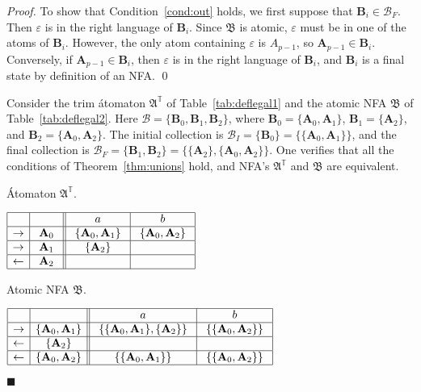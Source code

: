 \documentclass{llncs}
\newcommand{\eps}{\varepsilon}
\newcommand{\bA}{{\mathbf A}}
\newcommand{\bmB}{\bm{B}}
\newcommand{\cB}{{\mathcal B}}
\newcommand{\fA}{{\mathfrak A}}
\newcommand{\fB}{{\mathfrak B}}
\newcommand{\trim}{\mathbb{T}}
\newcommand{\qedb}{\hfill$\blacksquare$}
\begin{document}
\begin{proof}
To show that Condition~\ref{cond:out} holds, we first suppose that
$\bmB_i\in \cB_F$. Then $\eps$ is in the right language of $\bmB_i$.
Since $\fB$ is atomic, $\eps$ must be in one of the atoms of $\bmB_i$.
However, the only atom containing $\eps$ is $A_{p-1}$, so $\bA_{p-1}\in\bmB_i$.
Conversely, if $\bA_{p-1}\in \bmB_i$, then $\eps$ is in the right language of  
$\bmB_i$, and $\bmB_i$ is a final state by definition of an NFA.
\qed
\end{proof}

\begin{example}
\label{ex:atomconstr}
Consider the trim \'atomaton $\fA^\trim$ of Table~\ref{tab:deflegal1} and 
the atomic NFA $\fB$ of Table~\ref{tab:deflegal2}.
Here $\cB=\{\bmB_0,\bmB_1,\bmB_2 \}$, where $\bmB_0=\{\bA_0,\bA_1\}$,
$\bmB_1=\{\bA_2\}$, and 
$\bmB_2=\{\bA_0,\bA_2\}$.
The initial collection is $\cB_I=\{\bmB_0 \}=\{ \{\bA_0,\bA_1\} \}$, and the final
collection is 
$\cB_F=\{\bmB_1,\bmB_2 \}=\{ \{\bA_2\},\{\bA_0,\bA_2\} \}$.
One verifies that all the conditions of Theorem~\ref{thm:unions} hold,
and  NFA's $\fA^\trim$ and $\fB$ are equivalent.
\begin{table}[t]
\begin{minipage}[b]{0.37\linewidth}
\caption{\'Atomaton $\fA^\trim$.}
\label{tab:deflegal1}
$
\begin{array}{|c| c||c| c| c|c|}    
\hline
& \ \  \ \ 
&\ \ a \ \ &\ \ b \ \   \\
\hline  
\rightarrow & \ \bA_0 \
&  \ \{\bA_0,\bA_1\} \  & \ \{\bA_0,\bA_2\} \    \\
\hline  
\rightarrow& \bA_1
&  \  \{\bA_2\} \  &   \\
\hline  
\leftarrow& \bA_2
&  \   \  &   \\
\hline
\end{array}
$
\end{minipage}
\hspace{.5cm}
\begin{minipage}[b]{0.55\linewidth}
\caption{Atomic NFA $\fB$.}
\label{tab:deflegal2}
$
\begin{array}{|c| c||c| c| }    
\hline
& \ \  \ \ 
&\ \ a \ \ &\ \ b \ \ \\
\hline  
\rightarrow & \{\bA_0,\bA_1\}
& \ \{ \{\bA_0,\bA_1\},\{\bA_2\} \} \ & \ \{ \{\bA_0,\bA_2\} \}\ \\
\hline  
\leftarrow& \ \{\bA_2\} \
&  & \\
\hline  
\leftarrow & \{\bA_0,\bA_2\}
& \ \{ \{\bA_0,\bA_1\} \} \ & \ \{ \{\bA_0,\bA_2\}\} \ \\
\hline  
\end{array}
$
\end{minipage}
\end{table}
\qedb
\end{example}
\end{document}
